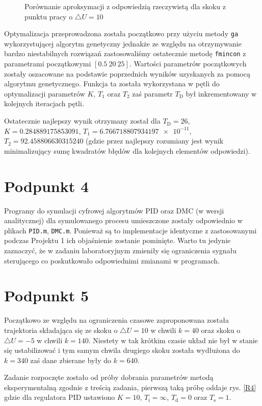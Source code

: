 \begin{figure}[ht]
\centering

\caption{Porównanie aproksymacji z odpowiedzią rzeczywistą dla skoku z punktu pracy o $\triangle U = 10$}
\label{R3}
\end{figure}

Optymalizacja przeprowadzona została początkowo przy użyciu metody \verb+ga+ wykorzystującej algorytm genetyczny jednakże ze względu na otrzymywanie bardzo niestabilnych rozwiązań zastosowaliśmy ostatecznie metodę \verb+fmincon+ z parametrami początkowymi $[\num{0,5} ~ 20 ~ 25]$. Wartości parametrów początkowych zostały oszacowane na podstawie poprzednich wyników uzyskanych za pomocą algorytmu genetycznego. Funkcja ta została wykorzystana w pętli do optymalizacji parametrów $K$, $T_1$ oraz $T_2$ zaś parametr $T_{\mathrm{D}}$ był inkrementowany w kolejnych iteracjach pętli.

Ostatecznie najlepszy wynik otrzymany został dla $T_{\mathrm{D}}=26$, $K=\num{0.284889175853091}$, $T_1=\num{6.766718807934197e-11}$, $T_2=\num{92.458806630315240}$ (gdzie przez najlepszy rozumiany jest wynik minimalizujący sumę kwadratów błędów dla kolejnych elementów odpowiedzi).

\chapter{Podpunkt 4}
Programy do symulacji cyfrowej algorytmów PID oraz DMC (w wersji analitycznej) dla symulowanego procesu umieszczone zostały odpowiednio w plikach \verb+PID.m+, \verb+DMC.m+. Ponieważ są to implementacje identyczne z zastosowanymi podczas Projektu 1 ich objaśnienie zostanie pominięte. Warto tu jedynie zaznaczyć, że w zadaniu laboratoryjnym zmieniły się ograniczenia sygnału sterującego co poskutkowało odpowiednimi zmianami w programach.

\chapter{Podpunkt 5}
Początkowo ze względu na ograniczenia czasowe zaproponowana została trajektoria składająca się ze skoku o $\triangle U=10$ w chwili $k=40$ oraz skoku o $\triangle U=-5$ w chwili $k=140$. Niestety w tak krótkim czasie układ nie był w stanie się ustabilizować i tym samym chwila drugiego skoku została wydłużona do $k=340$ zaś dane zbierane były do $k=640$.

Zadanie rozpoczęte zostało od próby dobrania parametrów metodą eksperymentalną zgodnie z treścią zadania, pierwszą taką próbę oddaje rys. \ref{R4} gdzie dla regulatora PID ustawiono $K=10$, $T_{\mathrm{i}}=\infty$, $T_{\mathrm{d}}=0$ oraz $T_{\mathrm{s}}=1$.

